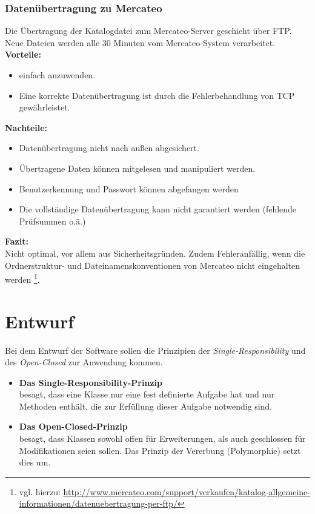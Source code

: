 	
	
	\subsubsection{Datenübertragung zu Mercateo}
	
	Die Übertragung der Katalogdatei zum Mercateo-Server geschieht über FTP. Neue Dateien werden alle 30 Minuten vom Mercateo-System verarbeitet.\\
	\textbf{Vorteile:}
 	\begin{itemize}[noitemsep]
   	\item einfach anzuwenden.
   	\item Eine korrekte Datenübertragung ist durch die Fehlerbehandlung von TCP gewährleistet.
   	\end{itemize}
	\textbf{Nachteile:}
   	\begin{itemize}[noitemsep]
   	\item Datenübertragung nicht nach außen abgesichert.
   	\item Übertragene Daten können mitgelesen und manipuliert werden.
   	\item Benutzerkennung und Passwort können abgefangen werden
   	\item Die vollständige Datenübertragung kann nicht garantiert werden (fehlende Prüfsummen o.ä.)
   	\end{itemize}
   	\textbf{Fazit:}\\
	Nicht optimal, vor allem aus Sicherheitsgründen. Zudem Fehleranfällig, wenn die Ordnerstruktur- und Dateinamenskonventionen von Mercateo nicht eingehalten werden \footnote{vgl. hierzu: \url{http://www.mercateo.com/support/verkaufen/katalog-allgemeine-informationen/datenuebertragung-per-ftp/}}.

	\pagebreak	
	\section{Entwurf}
	
	Bei dem Entwurf der Software sollen die Prinzipien der \textit{Single-Responsibility} und des \textit{Open-Closed} zur Anwendung kommen.
	
	\begin{itemize}
	\item \textbf{Das Single-Responsibility-Prinzip}\\besagt, dass eine Klasse nur eine fest definierte Aufgabe hat und nur Methoden enthält, die zur Erfüllung dieser Aufgabe notwendig sind.
	\item \textbf{Das Open-Closed-Prinzip}\\ besagt, dass Klassen sowohl offen für Erweiterungen, als auch geschlossen für Modifikationen seien sollen. Das Prinzip der Vererbung (Polymorphie) setzt dies um.
	\end{itemize}
	
